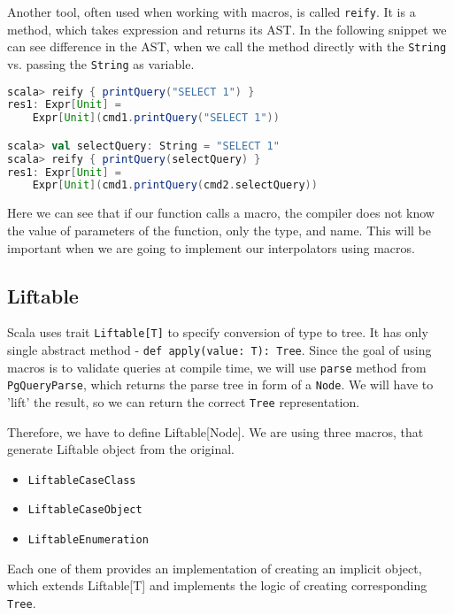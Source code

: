 Another tool, often used when working with macros, is called \texttt{reify}. It is a method, which takes expression and returns its AST. In the following snippet we can see difference in the AST, when we call the method directly with the \texttt{String} vs. passing the \texttt{String} as variable.
\newpage
\begin{lstlisting}[language=scala, basicstyle=\ttfamily, showstringspaces=false, caption={Comparison of ASTs of function calls with \texttt{String} and with variable}]
scala> reify { printQuery("SELECT 1") }
res1: Expr[Unit] = 
    Expr[Unit](cmd1.printQuery("SELECT 1"))

scala> val selectQuery: String = "SELECT 1"
scala> reify { printQuery(selectQuery) }
res1: Expr[Unit] = 
    Expr[Unit](cmd1.printQuery(cmd2.selectQuery))
\end{lstlisting}
Here we can see that if our function calls a macro, the compiler does not know the value of parameters of the function, only the type, and name. This will be important when we are going to implement our interpolators using macros.

\subsection{Liftable}
Scala uses trait \texttt{Liftable[T]} to specify conversion of type to tree. It has only single abstract method - \texttt{def apply(value: T): Tree}. Since the goal of using macros is to validate queries at compile time, we will use \texttt{parse} method from \texttt{PgQueryParse}, which returns the parse tree in form of a \texttt{Node}. We will have to 'lift' the result, so we can return the correct \texttt{Tree} representation. \cite{Liftable}

Therefore, we have to define Liftable[Node]. We are using three macros, that generate Liftable object from the original. 
\begin{itemize}
    \item \texttt{LiftableCaseClass}
    \item \texttt{LiftableCaseObject}
    \item \texttt{LiftableEnumeration}
\end{itemize}
Each one of them provides an implementation of creating an implicit object, which extends Liftable[T] and implements the logic of creating corresponding \texttt{Tree}.
